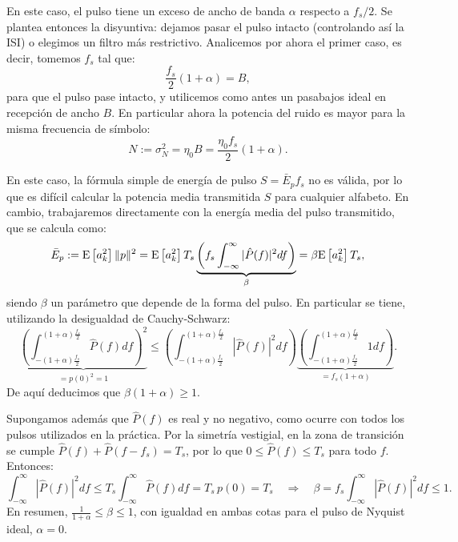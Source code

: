 \begin{ejemplo}\label{ej:nyquist no ideal ruido}
    
    En este caso, el pulso tiene un exceso de ancho de banda $\alpha$ respecto a $f_s/2$. Se plantea entonces la disyuntiva: dejamos pasar el pulso intacto (controlando así la ISI) o elegimos un filtro más restrictivo. Analicemos por ahora el primer caso, es decir, tomemos $f_s$ tal que:
    \begin{equation*}
        \frac{f_s}{2}(1+\alpha) = B,
    \end{equation*}
    para que el pulso pase intacto, y utilicemos como antes un pasabajos ideal en recepción de ancho $B$. En particular ahora la potencia del ruido es mayor para la misma frecuencia de símbolo:
    \begin{equation*}
        N := \sigma_N^2 = \eta_0 B = \frac{\eta_0f_s}{2}(1+\alpha).
    \end{equation*}

    En este caso, la fórmula simple de energía de pulso $S=\bar{E}_p f_s$ no es válida, por lo que es difícil calcular la potencia media transmitida $S$ para cualquier alfabeto. En cambio, trabajaremos directamente con la energía media del pulso transmitido, que se calcula como:
    \begin{equation*}
        \bar{E}_p := \E{a_k^2}\|p\|^2 = \E{a_k^2}T_s \underbrace{\left(f_s \int_{-\infty}^\infty |\hat{P}(f)|^2df\right)}_{\beta} = \beta \E{a_k^2} T_s,
    \end{equation*}
    siendo $\beta$ un parámetro que depende de la forma del pulso. En particular se tiene, utilizando la desigualdad de Cauchy-Schwarz:
    \begin{equation*}
        \underbrace{\left(\int_{-(1+\alpha)\frac{f_s}{2}}^{(1+\alpha)\frac{f_s}{2}} \hat{P}(f)df\right)^2}_{=p(0)^2=1} \leqslant \left(\int_{-(1+\alpha)\frac{f_s}{2}}^{(1+\alpha)\frac{f_s}{2}} |\hat{P}(f)|^2 df\right) \underbrace{\left(\int_{-(1+\alpha)\frac{f_s}{2}}^{(1+\alpha)\frac{f_s}{2}} 1 df\right)}_{=f_s(1+\alpha)}.
    \end{equation*}
    De aquí deducimos que $\beta(1+\alpha)\geqslant 1$.

    Supongamos además que $\hat{P}(f)$ es real y no negativo, como ocurre con todos los pulsos utilizados en la práctica. Por la simetría vestigial, en la zona de transición se cumple $\hat{P}(f) + \hat{P}(f-f_s) = T_s$, por lo que $0\leqslant\hat{P}(f)\leqslant T_s$ para todo $f$. Entonces:
    \begin{equation*}
        \int_{-\infty}^\infty |\hat{P}(f)|^2 df \leqslant T_s \int_{-\infty}^\infty \hat{P}(f) df = T_s\, p(0) = T_s \quad \Longrightarrow \quad \beta = f_s \int_{-\infty}^\infty |\hat{P}(f)|^2 df \leqslant 1.
    \end{equation*}
    En resumen, $\frac{1}{1+\alpha}\leqslant\beta\leqslant 1$, con igualdad en ambas cotas para el pulso de Nyquist ideal, $\alpha=0$.


\end{ejemplo}
